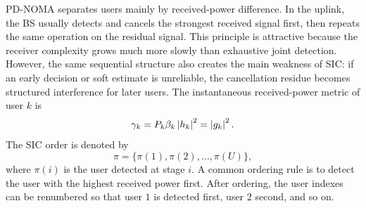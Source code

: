 PD-NOMA separates users mainly by received-power difference. In the uplink, the BS usually detects and cancels the strongest received signal first, then repeats the same operation on the residual signal. This principle is attractive because the receiver complexity grows much more slowly than exhaustive joint detection. However, the same sequential structure also creates the main weakness of SIC: if an early decision or soft estimate is unreliable, the cancellation residue becomes structured interference for later users. The instantaneous received-power metric of user $k$ is
\begin{equation}
    \gamma_k = P_k\beta_k\left\lvert h_k \right\rvert^2 = \left\lvert g_k \right\rvert^2 .
    \label{eq:received-power}
\end{equation}
The SIC order is denoted by
\begin{equation}
    \pi=\{\pi(1),\pi(2),\ldots,\pi(U)\},
\end{equation}
where $\pi(i)$ is the user detected at stage $i$. A common ordering rule is to detect the user with the highest received power first. After ordering, the user indexes can be renumbered so that user $1$ is detected first, user $2$ second, and so on.

